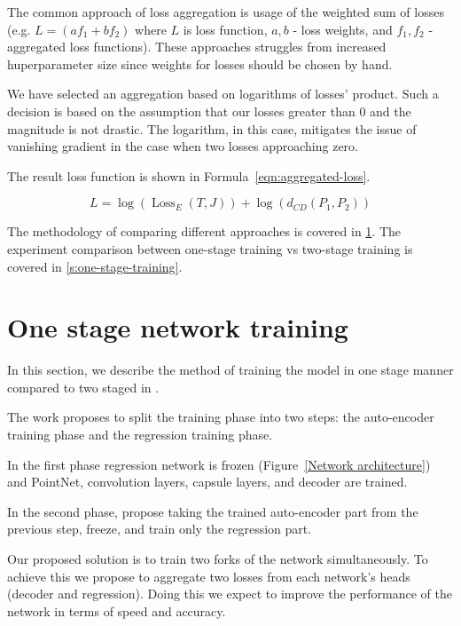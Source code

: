 The common approach of loss aggregation is usage of the weighted sum of losses \parencite{redmon_you_2016,cipolla_multi-task_2018,zhao_loss_2018} (e.g. $L = (af_1+bf_2)$ where $L$ is loss function, $a, b$ - loss weights, and $f_1, f_2$ - aggregated loss functions). These approaches struggles from increased huperparameter size since weights for losses should be chosen by hand.

We have selected an aggregation based on logarithms of losses' product. Such a decision is based on the assumption that our losses greater than $0$ and the magnitude is not drastic. The logarithm, in this case, mitigates the issue of vanishing gradient in the case when two losses approaching zero.

The result loss function is shown in Formula~\ref{eqn:aggregated-loss}.

\begin{equation}
    L = \log{(\operatorname{Loss}_{E}(T, J))} + \log{( d_{C D}\left(P_{1}, P_{2}\right))}
\label{eqn:aggregated-loss}
\end{equation}

The methodology of comparing different approaches is covered in \ref{s:one-stage-network-training}. The experiment comparison between one-stage training vs two-stage training is covered in \ref{s:one-stage-training}.

\section{One stage network training}
\label{s:one-stage-network-training}
In this section, we describe the method of training the model in one stage manner compared to two staged in \cite{wu_3d_2020}.

The work \cite{wu_3d_2020} proposes to split the training phase into two steps: the auto-encoder training phase and the regression training phase.

In the first phase regression network is frozen (Figure~\ref{Network architecture}) and PointNet, convolution layers, capsule layers, and decoder are trained. 

In the second phase, \cite{wu_3d_2020} propose taking the trained auto-encoder part from the previous step, freeze, and train only the regression part.

Our proposed solution is to train two forks of the network simultaneously. To achieve this we propose to aggregate two losses from each network's heads (decoder and regression). Doing this we expect to improve the performance of the network in terms of speed and accuracy.

